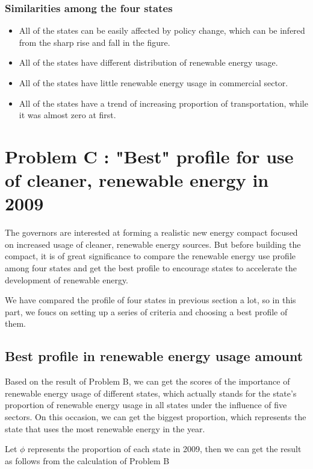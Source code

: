 \documentclass[a4paper,11pt]{article}
\begin{document}
\subsubsection{Similarities among the four states}

\begin{itemize}
    \item All of the states can be easily affected by policy change, which can be infered from the sharp rise and fall in the figure.
    \item All of the states have different distribution of renewable energy usage.
    \item All of the states have little renewable energy usage in commercial sector.
    \item All of the states have a trend of increasing proportion of transportation, while it was almost zero at first.
\end{itemize}


\section{Problem C : "Best" profile for use of cleaner, renewable energy in 2009}

\par The governors are interested at forming a realistic new energy compact focused on increased usage of cleaner, renewable energy sources. But before building the compact, it is of great significance to compare the renewable energy use profile among four states and get the best profile to encourage states to accelerate the development of renewable energy.

\par We have compared the profile of four states in previous section a lot, so in this part, we foucs on setting up a series of criteria and choosing a best profile of them. 

\subsection{Best profile in renewable energy usage amount}
\par Based on the result of Problem B, we can get the scores of the importance of renewable energy usage of different states, which actually stands for the state's proportion of renewable energy usage in all states under the influence of five sectors. On this occasion, we can get the biggest proportion, which represents the state that uses the most renewable energy in the year.
\par Let $\phi$ represents the proportion of each state in 2009, then we can get the result as follows from the calculation of Problem B
\end{document}
